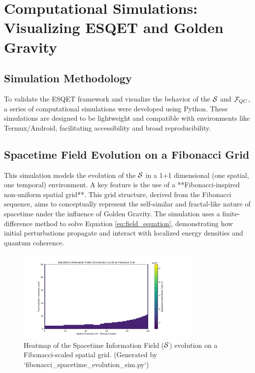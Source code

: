 \chapter{Computational Simulations: Visualizing ESQET and Golden Gravity}
\label{ch:simulations}

\section{Simulation Methodology}
To validate the ESQET framework and visualize the behavior of the $\mathcal{S}$ and $\mathcal{F}_{QC}$, a series of computational simulations were developed using Python. These simulations are designed to be lightweight and compatible with environments like Termux/Android, facilitating accessibility and broad reproducibility.

\section{Spacetime Field Evolution on a Fibonacci Grid}
This simulation models the evolution of the $\mathcal{S}$ in a 1+1 dimensional (one spatial, one temporal) environment. A key feature is the use of a **Fibonacci-inspired non-uniform spatial grid**. This grid structure, derived from the Fibonacci sequence, aims to conceptually represent the self-similar and fractal-like nature of spacetime under the influence of Golden Gravity. The simulation uses a finite-difference method to solve Equation \ref{eq:field_equation}, demonstrating how initial perturbations propagate and interact with localized energy densities and quantum coherence.

\begin{figure}[h!]
    \centering
    \includegraphics[width=0.8\textwidth]{figures/fibonacci_spacetime_evolution_v2.png} %
    \caption{Heatmap of the Spacetime Information Field ($\mathcal{S}$) evolution on a Fibonacci-scaled spatial grid. (Generated by `fibonacci_spacetime_evolution_sim.py`)}
    \label{fig:fibonacci_s_evolution}
\end{figure}

